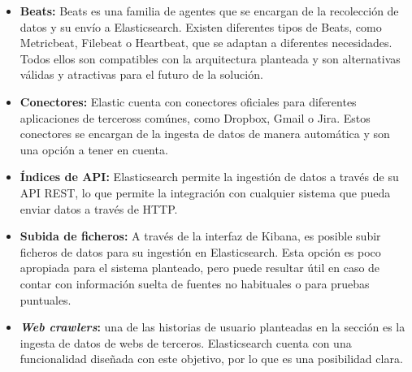 \begin{itemize}
	\item \textbf{Beats:} Beats es una familia de agentes que se encargan de
		la recolección de datos y su envío a Elasticsearch. Existen diferentes
		tipos de Beats, como Metricbeat, Filebeat o Heartbeat, que se adaptan a
		diferentes necesidades. Todos ellos son compatibles con la arquitectura
		planteada y son alternativas válidas y atractivas para el futuro de la
		solución.
	\item \textbf{Conectores:} Elastic cuenta con conectores oficiales para
		diferentes aplicaciones de terceross comúnes, como Dropbox, Gmail o
		Jira. Estos conectores se encargan de la ingesta de datos de manera
		automática y son una opción a tener en cuenta.
	\item \textbf{Índices de API:} Elasticsearch permite la ingestión de datos
		a través de su API REST, lo que permite la integración con cualquier
		sistema que pueda enviar datos a través de HTTP.
	\item \textbf{Subida de ficheros:} A través de la interfaz de Kibana, es
		posible subir ficheros de datos para su ingestión en Elasticsearch. Esta
		opción es poco apropiada para el sistema planteado, pero puede resultar
		útil en caso de contar con información suelta de fuentes no habituales o
		para pruebas puntuales.
	\item \textbf{\textit{Web crawlers}:} una de las historias de usuario
		planteadas en la sección  es la ingesta de
		datos de webs de terceros. Elasticsearch cuenta con una funcionalidad
		diseñada con este objetivo, por lo que es una posibilidad clara.
\end{itemize}
